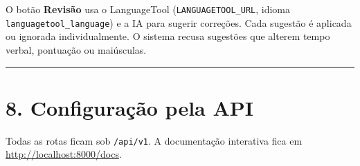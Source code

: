 \documentclass[
  brazilian,
  a4paper,12pt,oneside]{report}
\begin{document}
O botão \textbf{Revisão} usa o LanguageTool
(\texttt{LANGUAGETOOL\_}\allowbreak{}\texttt{URL}, idioma
\texttt{languagetool\_}\allowbreak{}\texttt{language}) e a IA para
sugerir correções. Cada sugestão é aplicada ou ignorada individualmente.
O sistema recusa sugestões que alterem tempo verbal, pontuação ou
maiúsculas.

\begin{center}\rule{0.5\linewidth}{0.5pt}\end{center}

\chapter{8. Configuração pela API}\label{configurauxe7uxe3o-pela-api}

Todas as rotas ficam sob
\texttt{/}\allowbreak{}\texttt{api/}\allowbreak{}\texttt{v1}. A
documentação interativa fica em \url{http://localhost:8000/docs}.
\end{document}
